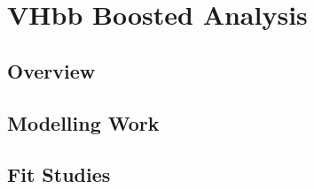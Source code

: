 \chapter{VHbb Boosted Analysis}
\label{chap:vhbbboost}

\section{Overview}

\section{Modelling Work}

\section{Fit Studies}
